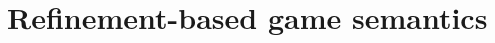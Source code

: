\documentclass[aspectratio=141]{beamer}
\newcommand{\kw}[1]{\ensuremath{ \mathsf{#1} }}
\newcommand{\bdot}{\boldsymbol{\cdot}}
\begin{document}
%
%
%
%
%
%
%
%

\section{Refinement-based game semantics} \label{sec:rbgs} %
\end{document}
